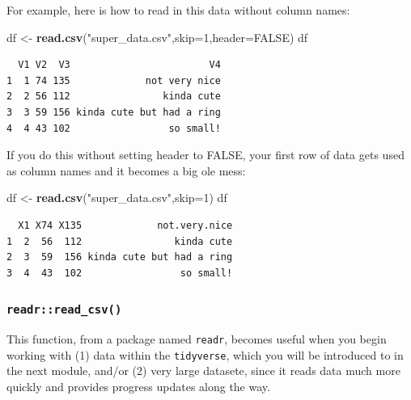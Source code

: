 \documentclass[
]{book}
\newenvironment{Shaded}{\begin{snugshade}}{\end{snugshade}}
\newcommand{\DataTypeTok}[1]{\textcolor[rgb]{0.13,0.29,0.53}{#1}}
\newcommand{\DecValTok}[1]{\textcolor[rgb]{0.00,0.00,0.81}{#1}}
\newcommand{\KeywordTok}[1]{\textcolor[rgb]{0.13,0.29,0.53}{\textbf{#1}}}
\newcommand{\NormalTok}[1]{#1}
\newcommand{\OtherTok}[1]{\textcolor[rgb]{0.56,0.35,0.01}{#1}}
\newcommand{\StringTok}[1]{\textcolor[rgb]{0.31,0.60,0.02}{#1}}
\begin{document}
For example, here is how to read in this data without column names:

\begin{Shaded}
\begin{Highlighting}[]
\NormalTok{df <-}\StringTok{ }\KeywordTok{read.csv}\NormalTok{(}\StringTok{"super_data.csv"}\NormalTok{,}\DataTypeTok{skip=}\DecValTok{1}\NormalTok{,}\DataTypeTok{header=}\OtherTok{FALSE}\NormalTok{)}
\NormalTok{df}
\end{Highlighting}
\end{Shaded}

\begin{verbatim}
  V1 V2  V3                        V4
1  1 74 135             not very nice
2  2 56 112                kinda cute
3  3 59 156 kinda cute but had a ring
4  4 43 102                 so small!
\end{verbatim}

If you do this without setting header to FALSE, your first row of data gets used as column names and it becomes a big ole mess:

\begin{Shaded}
\begin{Highlighting}[]
\NormalTok{df <-}\StringTok{ }\KeywordTok{read.csv}\NormalTok{(}\StringTok{"super_data.csv"}\NormalTok{,}\DataTypeTok{skip=}\DecValTok{1}\NormalTok{)}
\NormalTok{df}
\end{Highlighting}
\end{Shaded}

\begin{verbatim}
  X1 X74 X135             not.very.nice
1  2  56  112                kinda cute
2  3  59  156 kinda cute but had a ring
3  4  43  102                 so small!
\end{verbatim}

\hypertarget{readrread_csv}{%
\subsubsection*{\texorpdfstring{\texttt{readr::read\_csv()}}{readr::read\_csv()}}\label{readrread_csv}}

This function, from a package named \texttt{readr}, becomes useful when you begin working with (1) data within the \texttt{tidyverse}, which you will be introduced to in the next module, and/or (2) very large datasete, since it reads data much more quickly and provides progress updates along the way.
\end{document}
